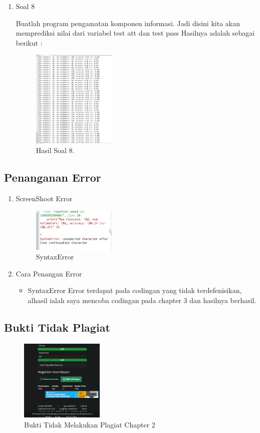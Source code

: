 \begin{enumerate}
	\item Soal 8
	\hfill\break
	
	Buatlah program pengamatan komponen informasi. Jadi disini kita akan memprediksi nilai dari variabel test att dan test pass Hasilnya adalah sebagai berikut :
	\begin{figure}[H]
	\centering
		\includegraphics[width=4cm]{figures/1174021/tugas4/materi/hasil8.PNG}
		\caption{Hasil Soal 8.}
	\end{figure}
\end{enumerate}

\subsection{Penanganan Error}
\begin{enumerate}
	\item ScreenShoot Error
	\begin{figure}[H]
		\includegraphics[width=4cm]{figures/1174021/tugas4/error/1.PNG}
		\centering
		\caption{SyntaxError}
	\end{figure}
	\item Cara Penangan Error
	\begin{itemize}
		\item SyntaxError
		\hfill\break
		Error terdapat pada codingan yang tidak terdefenisikan, alhasil ialah saya mencoba codingan pada chapter 3 dan hasilnya berhasil.
	\end{itemize}
\end{enumerate}

\subsection{Bukti Tidak Plagiat}
\begin{figure}[H]
\centering
	\includegraphics[width=4cm]{figures/1174021/tugas4/buktiplagiat/1.PNG}
	\caption{Bukti Tidak Melakukan Plagiat Chapter 2}
\end{figure}


